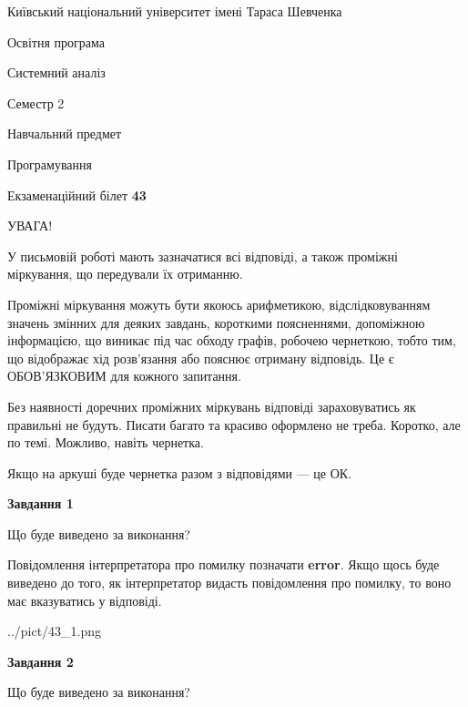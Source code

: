 \documentclass[12pt, ukrainian]{article}
\begin{document}
{{\begin {small}\par
{ \center  Київський національний університет імені Тараса Шевченка \par}
{\parbox {5 cm}{Освітня програма \hfill}{\parbox {7 cm}{Системний аналіз \hfill}}\parbox {6 cm}{\hfill Семестр 2}}\par
{\parbox {5 cm} {Навчальний предмет \hfill}\parbox {7 cm}{Програмування \hfill}\parbox {6cm}{\hfill}\par}\vspace{-7pt} \end{small}}{\center Екзаменаційний білет \No \textbf
{ 43 }\par}}
{
\begin {large}
УВАГА!

У письмовій роботі мають зазначатися всі відповіді, а також проміжні міркування, що передували їх отриманню.

Проміжні міркування можуть бути якоюсь арифметикою, відслідковуванням зна\-чень змінних для деяких завдань,
короткими поясненнями, допоміжною інформацією, що виникає під час обходу графів, робочею чернеткою,
тобто тим, що відображає хід розв’язання або пояснює отриману відповідь.
Це є ОБОВ’ЯЗКОВИМ для кожного запитання.

Без наявності доречних проміжних міркувань відповіді зараховуватись як правиль\-ні не будуть.
Писати багато та красиво оформлено не треба. Коротко, але по темі. Можли\-во, навіть чернетка.

Якщо на аркуші буде чернетка разом з відповідями --- це ОК.

\newpage

{\begin {center}\textbf{Завдання 1}\end {center}}\par
Що буде виведено за виконання?

Повідомлення інтерпретатора про помилку позначати \textbf{error}.
Якщо щось буде виведено до того, як інтерпретатор видасть повідомлення про помилку, 
то воно має вказуватись у відповіді. \par


\begin{center}
	{../pict/43_1.png}
\end{center}
\newpage

{\begin {center}\textbf{Завдання 2}\end {center}}\par
Що буде виведено за виконання?


\end{large}}
\end{document}
